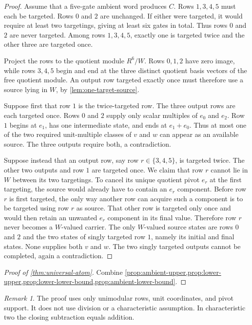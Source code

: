 \documentclass[11pt]{amsart}
\numberwithin{equation}{section}
\theoremstyle{definition}
\theoremstyle{remark}
\newtheorem{remark}[theorem]{Remark}
\begin{document}
\begin{proof}
Assume that a five-gate ambient word produces $C$.  Rows $1,3,4,5$ must each be targeted.  Rows $0$ and $2$ are unchanged.  If either were targeted, it would require at least two targetings, giving at least six gates in total.  Thus rows $0$ and $2$ are never targeted.  Among rows $1,3,4,5$, exactly one is targeted twice and the other three are targeted once.

Project the rows to the quotient module $R^6/W$.  Rows $0,1,2$ have zero image, while rows $3,4,5$ begin and end at the three distinct quotient basis vectors of the free quotient module.  An output row targeted exactly once must therefore use a source lying in $W$, by \cref{lem:one-target-source}.

Suppose first that row $1$ is the twice-targeted row.  The three output rows are each targeted once.  Rows $0$ and $2$ supply only scalar multiples of $e_0$ and $e_2$.  Row $1$ begins at $e_1$, has one intermediate state, and ends at $e_1+e_0$.  Thus at most one of the two required unit-multiple classes of $v$ and $w$ can appear as an available source.  The three outputs require both, a contradiction.

Suppose instead that an output row, say row $r\in\{3,4,5\}$, is targeted twice.  The other two outputs and row $1$ are targeted once.  We claim that row $r$ cannot lie in $W$ between its two targetings.  To cancel its unique quotient pivot $e_r$ at the first targeting, the source would already have to contain an $e_r$ component.  Before row $r$ is first targeted, the only way another row can acquire such a component is to be targeted using row $r$ as source.  That other row is targeted only once and would then retain an unwanted $e_r$ component in its final value.  Therefore row $r$ never becomes a $W$-valued carrier.  The only $W$-valued source states are rows $0$ and $2$ and the two states of singly targeted row $1$, namely its initial and final states.  None supplies both $v$ and $w$.  The two singly targeted outputs cannot be completed, again a contradiction.
\end{proof}

\begin{proof}[Proof of \cref{thm:universal-atom}]
Combine \cref{prop:ambient-upper,prop:lower-upper,prop:lower-lower-bound,prop:ambient-lower-bound}.
\end{proof}

\begin{remark}
The proof uses only unimodular rows, unit coordinates, and pivot support.  It does not use division or a characteristic assumption.  In characteristic two the closing subtraction equals addition.
\end{remark}
\end{document}
